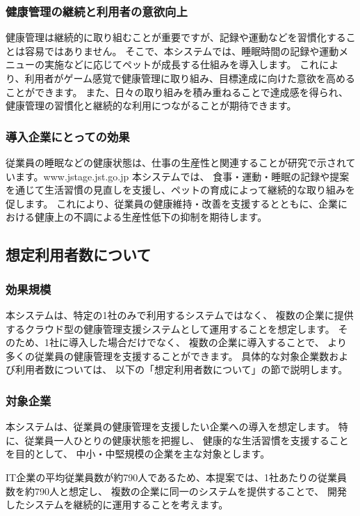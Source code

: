 \documentclass[uplatex,dvipdfmx]{jlreq}
\begin{document}
\subsubsection{健康管理の継続と利用者の意欲向上}
健康管理は継続的に取り組むことが重要ですが、記録や運動などを習慣化することは容易ではありません。
そこで、本システムでは、睡眠時間の記録や運動メニューの実施などに応じてペットが成長する仕組みを導入します。
これにより、利用者がゲーム感覚で健康管理に取り組み、目標達成に向けた意欲を高めることができます。
また、日々の取り組みを積み重ねることで達成感を得られ、健康管理の習慣化と継続的な利用につながることが期待できます。 

\subsubsection{導入企業にとっての効果}
従業員の睡眠などの健康状態は、仕事の生産性と関連することが研究で示されています。www.jstage.jst.go.jp 本システムでは、
食事・運動・睡眠の記録や提案を通じて生活習慣の見直しを支援し、ペットの育成によって継続的な取り組みを促します。
これにより、従業員の健康維持・改善を支援するとともに、企業における健康上の不調による生産性低下の抑制を期待します。


\subsection{想定利用者数について} 

\subsubsection{効果規模} 
本システムは、特定の1社のみで利用するシステムではなく、 複数の企業に提供するクラウド型の健康管理支援システムとして運用することを想定します。 
そのため、1社に導入した場合だけでなく、 複数の企業に導入することで、 より多くの従業員の健康管理を支援することができます。 
具体的な対象企業数および利用者数については、 以下の「想定利用者数について」の節で説明します。 

\subsubsection{対象企業} 
本システムは、従業員の健康管理を支援したい企業への導入を想定します。 
特に、従業員一人ひとりの健康状態を把握し、 健康的な生活習慣を支援することを目的として、 中小・中堅規模の企業を主な対象とします。 

 IT企業の平均従業員数が約790人であるため、本提案では、1社あたりの従業員数を約790人と想定し、 複数の企業に同一のシステムを提供することで、 開発したシステムを継続的に運用することを考えます。\cite{bib:employees}
\end{document}
